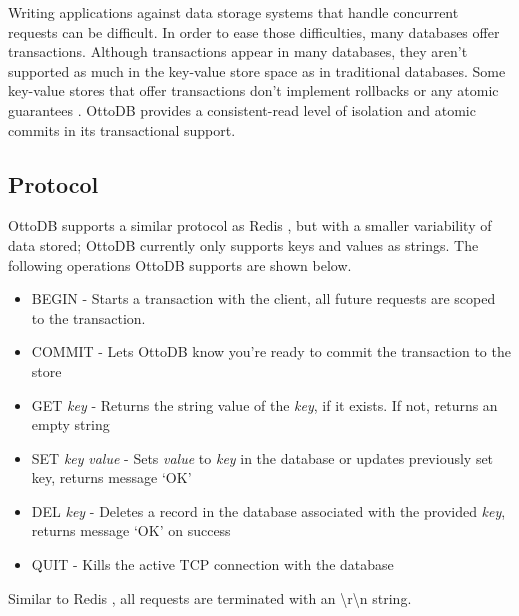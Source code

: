\documentclass[conference]{IEEEtran}
\begin{document}
    Writing applications against data storage systems that handle concurrent requests can be difficult. In order to ease those difficulties, many databases offer transactions. Although transactions appear in many databases, they aren’t supported as much in the key-value store space as in traditional databases. Some key-value stores that offer transactions don’t implement rollbacks or any atomic guarantees \cite{b1}. OttoDB provides a consistent-read level of isolation and atomic commits in its transactional support.

    \subsection{Protocol}

    OttoDB supports a similar protocol as Redis \cite{b1}, but with a smaller variability of data stored; OttoDB currently only supports keys and values as strings. The following operations OttoDB supports are shown below.

    \begin{itemize}
        \item BEGIN - Starts a transaction with the client, all future requests are scoped to the transaction.
        \item COMMIT - Lets OttoDB know you’re ready to commit the transaction to the store
        \item GET \textit{key} - Returns the string value of the \textit{key}, if it exists. If not, returns an empty string
        \item SET \textit{key} \textit{value} - Sets \textit{value} to \textit{key} in the database or updates previously set key, returns message ‘OK’
        \item DEL \textit{key} - Deletes a record in the database associated with the provided \textit{key}, returns message ‘OK’ on success
        \item QUIT - Kills the active TCP connection with the database
    \end{itemize}

    Similar to Redis \cite{b1}, all requests are terminated with an {\textbackslash}r{\textbackslash}n string. 

\end{document}
